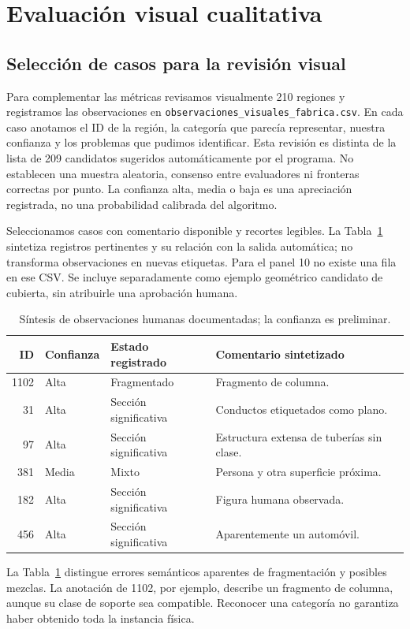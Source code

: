 \documentclass[journal,onecolumn]{IEEEtran}
\begin{document}
\section{Evaluación visual cualitativa}
\subsection{Selección de casos para la revisión visual}
Para complementar las métricas revisamos visualmente 210 regiones y registramos las observaciones en \texttt{observaciones\_visuales\_fabrica.csv}. En cada caso anotamos el ID de la región, la categoría que parecía representar, nuestra confianza y los problemas que pudimos identificar. Esta revisión es distinta de la lista de 209 candidatos sugeridos automáticamente por el programa. No establecen una muestra aleatoria, consenso entre evaluadores ni fronteras correctas por punto. La confianza alta, media o baja es una apreciación registrada, no una probabilidad calibrada del algoritmo.

Seleccionamos casos con comentario disponible y recortes legibles. La Tabla~\ref{tab:humana} sintetiza registros pertinentes y su relación con la salida automática; no transforma observaciones en nuevas etiquetas. Para el panel 10 no existe una fila en ese CSV. Se incluye separadamente como ejemplo geométrico candidato de cubierta, sin atribuirle una aprobación humana.
\begin{table}[H]
\centering\caption{Síntesis de observaciones humanas documentadas; la confianza es preliminar.}\label{tab:humana}
\small
\begin{tabular}{rlll}\toprule
ID & Confianza & Estado registrado & Comentario sintetizado\\\midrule
1102 & Alta & Fragmentado & Fragmento de columna.\\
31 & Alta & Sección significativa & Conductos etiquetados como plano.\\
97 & Alta & Sección significativa & Estructura extensa de tuberías sin clase.\\
381 & Media & Mixto & Persona y otra superficie próxima.\\
182 & Alta & Sección significativa & Figura humana observada.\\
456 & Alta & Sección significativa & Aparentemente un automóvil.\\
\bottomrule\end{tabular}
\end{table}

La Tabla~\ref{tab:humana} distingue errores semánticos aparentes de fragmentación y posibles mezclas. La anotación de 1102, por ejemplo, describe un fragmento de columna, aunque su clase de soporte sea compatible. Reconocer una categoría no garantiza haber obtenido toda la instancia física.
\end{document}
